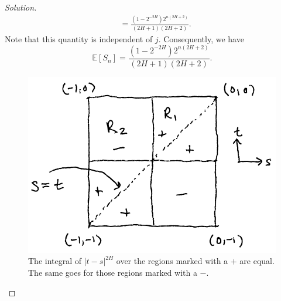 \documentclass[11pt,letterpaper]{report}
\newcommand{\E}{\mathbb{E}}
\newenvironment{solution}
{\begin{proof}[Solution]}
{\end{proof}}
\begin{document}
\begin{solution}
\begin{align*}
		&= \frac{(1-2^{-2H})2^{n(2H+2)}}{(2H+1)(2H+2)}.
	\end{align*}
	Note that this quantity is independent of $j$. Consequently, we have
	\[
	\E[S_n] = \frac{(1-2^{-2H})2^{n(2H+2)}}{(2H+1)(2H+2)}.
	\]
	\begin{figure}[t]
		\centering
		\includegraphics[scale=.6]{region.png}
		\caption{The integral of $|t-s|^{2H}$ over the regions marked with a $+$ are equal. The same goes for those regions marked with a $-$.}
	\end{figure}
\end{solution}
\end{document}
